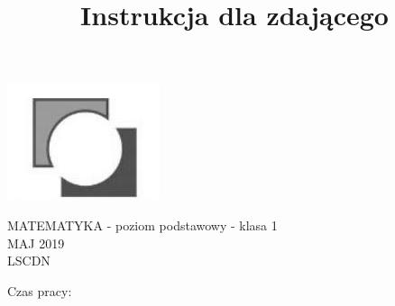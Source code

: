 \documentclass[10pt]{article}
\title{Instrukcja dla zdającego }
\author{}
\date{}
\begin{document}
\maketitle
\begin{center}
\includegraphics[max width=\textwidth]{2024_11_21_a68a2ba4fc31c5fb438eg-01}
\end{center}

MATEMATYKA - poziom podstawowy - klasa 1\\
MAJ 2019\\
LSCDN

Czas pracy:
\end{document}
